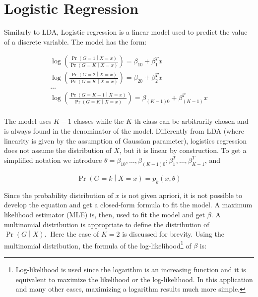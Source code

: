 \section{Logistic Regression} \label{secLogisticRegression}

Similarly to LDA, Logistic regression is a linear model used to predict the value of a discrete variable. The model has the form:

\begin{equation}
\begin{split}
    \log{\left(\frac{\Pr{\left(G=1\middle| X=x\right)}}{\Pr{\left(G=K\middle| X=x\right)}}\right)=\beta_{10}+\beta_1^Tx} \\
    \log{\left(\frac{\Pr{\left(G=2\middle| X=x\right)}}{\Pr{\left(G=K\middle| X=x\right)}}\right)=\beta_{20}+\beta_2^Tx} \\
    \ldots \\
    \log{\left(\frac{\Pr{\left(G=K-1\middle| X=x\right)}}{\Pr{\left(G=K\middle| X=x\right)}}\right)=\beta_{(K-1)0}+\beta_{(K-1)}^Tx} \\
\end{split}
\label{eq_LogisticRegression1}
\end{equation}

The model uses $K-1$ classes while the $K$-th class can be arbitrarily chosen and is always found in the denominator of the model. Differently from LDA (where linearity is given by the assumption of Gaussian parameter), logistics regression does not assume the distribution of $X$, but it is linear by construction. To get a simplified notation we introduce $\theta={\beta_{10},\ldots{,\beta}_{\left(K-1\right)0};\beta_1^T,\ldots,\beta_{K-1}^T}$, and

\begin{equation}
    \Pr{\left(G=k\middle| X=x\right)}=p_k(x,\theta)
    \label{eq_LogisticRegression2}
\end{equation}

Since the probability distribution of $x$ is not given apriori, it is not possible to develop the equation and get a closed-form formula to fit the model. A maximum likelihood estimator (MLE) is, then, used to fit the model and get $\beta$. A multinomial distribution is appropriate to define the distribution of $\Pr{\left(G\middle| X\right).\ }$ Here the case of  $K=2$ is discussed for brevity. Using the multinomial distribution, the formula of the log-likelihood\footnote{Log-likelihood is used since the logarithm is an increasing function and it is equivalent to maximize the likelihood or the log-likelihood. In this application and many other cases, maximizing a logarithm results much more simple.} of $\beta$ is:

